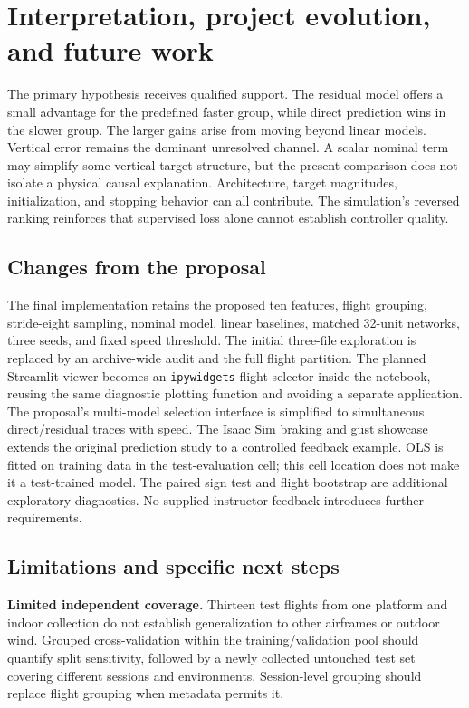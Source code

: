 \documentclass[10pt,letterpaper]{article}
\begin{document}
\clearpage
\section{Interpretation, project evolution, and future work}
The primary hypothesis receives qualified support. The residual model offers a small advantage for the predefined faster group, while direct prediction wins in the slower group. The larger gains arise from moving beyond linear models. Vertical error remains the dominant unresolved channel. A scalar nominal term may simplify some vertical target structure, but the present comparison does not isolate a physical causal explanation. Architecture, target magnitudes, initialization, and stopping behavior can all contribute. The simulation's reversed ranking reinforces that supervised loss alone cannot establish controller quality.

\subsection{Changes from the proposal}
The final implementation retains the proposed ten features, flight grouping, stride-eight sampling, nominal model, linear baselines, matched 32-unit networks, three seeds, and fixed speed threshold. The initial three-file exploration is replaced by an archive-wide audit and the full flight partition. The planned Streamlit viewer becomes an \texttt{ipywidgets} flight selector inside the notebook, reusing the same diagnostic plotting function and avoiding a separate application. The proposal's multi-model selection interface is simplified to simultaneous direct/residual traces with speed. The Isaac Sim braking and gust showcase extends the original prediction study to a controlled feedback example. OLS is fitted on training data in the test-evaluation cell; this cell location does not make it a test-trained model. The paired sign test and flight bootstrap are additional exploratory diagnostics. No supplied instructor feedback introduces further requirements.

\subsection{Limitations and specific next steps}
\textbf{Limited independent coverage.} Thirteen test flights from one platform and indoor collection do not establish generalization to other airframes or outdoor wind. Grouped cross-validation within the training/validation pool should quantify split sensitivity, followed by a newly collected untouched test set covering different sessions and environments. Session-level grouping should replace flight grouping when metadata permits it.
\end{document}
